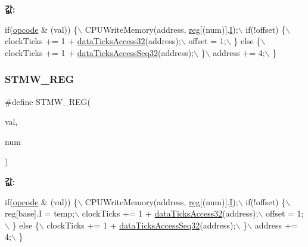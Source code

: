 {\bfseries 값\+:}
\begin{DoxyCode}
\textcolor{keywordflow}{if}(\mbox{\hyperlink{arm-new_8h_a4fc220098f4b9d0e039a28274d05c198}{opcode}} & (val)) \{\(\backslash\)
    CPUWriteMemory(address, \mbox{\hyperlink{_g_b_a_8h_ae29faba89509024ffd1a292badcedf2d}{reg}}[(num)].\mbox{\hyperlink{arm-new_8h_a782b7c7c9a56a2031f6270eac7f000d6}{I}});\(\backslash\)
    if(!offset) \{\(\backslash\)
      clockTicks += 1 + \mbox{\hyperlink{_g_b_a_8cpp_ac863611762e3e5f63cd5babe38b2fcc7}{dataTicksAccess32}}(address);\(\backslash\)
      offset = 1;\(\backslash\)
    \} \textcolor{keywordflow}{else} \{\(\backslash\)
      clockTicks += 1 + \mbox{\hyperlink{_g_b_a_8cpp_a7f6f2734b76f7d8031fc2ffc5673aa74}{dataTicksAccessSeq32}}(address);\(\backslash\)
    \}\(\backslash\)
    address += 4;\(\backslash\)
  \}
\end{DoxyCode}
\mbox{\label{arm-new_8h_a0d1e406c5edc8a5d05485c789df35b1d}} 
\subsubsection{\texorpdfstring{S\+T\+M\+W\+\_\+\+R\+EG}{STMW\_REG}\hspace{0.1cm}{\footnotesize\ttfamily [1/2]}}
{\footnotesize\ttfamily \#define S\+T\+M\+W\+\_\+\+R\+EG(\begin{DoxyParamCaption}\item[{}]{val,  }\item[{}]{num }\end{DoxyParamCaption})}

{\bfseries 값\+:}
\begin{DoxyCode}
\textcolor{keywordflow}{if}(\mbox{\hyperlink{arm-new_8h_a4fc220098f4b9d0e039a28274d05c198}{opcode}} & (val)) \{\(\backslash\)
    CPUWriteMemory(address, \mbox{\hyperlink{_g_b_a_8h_ae29faba89509024ffd1a292badcedf2d}{reg}}[(num)].\mbox{\hyperlink{arm-new_8h_a782b7c7c9a56a2031f6270eac7f000d6}{I}});\(\backslash\)
    if(!offset) \{\(\backslash\)
      reg[base].I = temp;\(\backslash\)
      clockTicks += 1 + \mbox{\hyperlink{_g_b_a_8cpp_ac863611762e3e5f63cd5babe38b2fcc7}{dataTicksAccess32}}(address);\(\backslash\)
      offset = 1;\(\backslash\)
    \} \textcolor{keywordflow}{else} \{\(\backslash\)
      clockTicks += 1 + \mbox{\hyperlink{_g_b_a_8cpp_a7f6f2734b76f7d8031fc2ffc5673aa74}{dataTicksAccessSeq32}}(address);\(\backslash\)
    \}\(\backslash\)
    address += 4;\(\backslash\)
  \}
\end{DoxyCode}
\mbox{\label{_g_b_a_8cpp_a0d1e406c5edc8a5d05485c789df35b1d}} 
